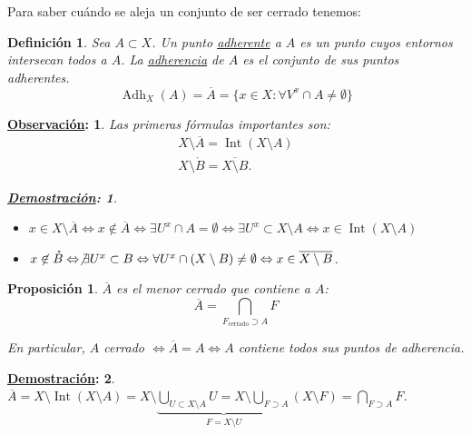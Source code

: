 \documentclass[10pt,a4paper,openright]{book}
\theoremstyle{break}
\newtheorem*{defi}{Definición}
\newtheorem*{prop}{Proposición}
\newtheorem*{demo}{\underline{Demostración}:}
\newtheorem*{obs}{\underline{Observación}:}
\DeclareMathOperator{\inter}{Int}
\DeclareMathOperator{\adh}{Adh}
\begin{document}
Para saber cuándo se aleja un conjunto de ser cerrado tenemos:
\begin{defi}
Sea $A \subset X$. Un punto \underline{adherente} a $A$ es un punto cuyos entornos intersecan todos a $A$. La \underline{adherencia} de $A$ es el conjunto de sus puntos adherentes. 
\[
\adh_X\left( A \right) = \overline{A} = \{x \in X: \forall V^x \cap A \neq \emptyset\} 
\]
\end{defi}

\begin{obs}
Las primeras fórmulas importantes son:
\begin{gather*}
    \boxed{X \setminus \overline{A} = \inter\left( X \setminus A \right)} \\
    \boxed{X \setminus \mathring{B} = \overline{X \setminus B}} 
.\end{gather*}
\begin{demo}
\begin{itemize}
    \item $x \in X \setminus \overline{A} \Leftrightarrow x \not\in \overline{A} \Leftrightarrow \exists U^x \cap A = \emptyset \Leftrightarrow \exists U^x \subset X \setminus A \Leftrightarrow x \in \inter\left( X \setminus A \right)$
    \item $x \not\in \mathring{B} \Leftrightarrow \not\exists U^x \subset B \Leftrightarrow \forall U^x \cap \left( X \setminus B \right) \neq \emptyset \Leftrightarrow x \in \overline{X \setminus B}$.
\end{itemize}
\end{demo}
\end{obs}

\begin{prop}
$\overline{A}$ es el menor cerrado que contiene a $A$: 
\[
    \boxed{\overline{A} = \bigcap_{F_{\text{cerrado}} \supset A} F } 
\]

En particular, $A$ cerrado $\Leftrightarrow \overline{A} = A \Leftrightarrow A$ contiene todos sus puntos de adherencia.
\end{prop}
\begin{demo}
$\overline{A} = X \setminus \inter\left( X \setminus A \right) = X \setminus \underbrace{\bigcup_{U \subset X \setminus A} U = X \setminus \bigcup_{F \supset A}}_{F = X \setminus U} \left( X \setminus F \right) = \bigcap_{F \supset A} F$.
\end{demo}
\end{document}
